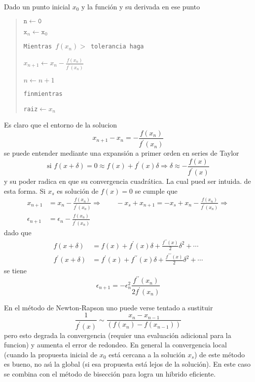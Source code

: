 \documentclass[spanish,titlepage,11pt]{article}
\begin{document}
Dado un punto inicial $x_{0}$ y la funci\'{o}n y su derivada en ese punto

\begin{quotation}
$\mathtt{n\leftarrow0}$

$\mathtt{x}_{n}\mathtt{\leftarrow x}_{0}$

\texttt{Mientras }$f(x_{n})>$\texttt{\ tolerancia haga}

\qquad$x_{n+1}\leftarrow x_{n}-\frac{f(x_{n})}{f^{\prime}(x_{n})}$

\qquad$n\leftarrow n+1$

\texttt{finmientras}

\texttt{raiz}$\leftarrow x_{n}$
\end{quotation}

Es claro que el entorno de la solucion
\[
x_{n+1}-x_{n}=-\frac{f(x_{n})}{f^{\prime}(x_{n})}
\]
se puede entender mediante una expansi\'{o}n a primer orden en series de
Taylor
\[
\text{si }f(x+\delta)=0\approx f(x)+f^{\prime}(x)\delta\Rightarrow
\delta\approx-\frac{f(x)}{f^{\prime}(x)}
\]
y su poder radica en que su convergencia cuadr\'{a}tica. La cual pued ser
intuida. de esta forma. Si $x_{s}$ es soluci\'{o}n de $f(x)=0$ se cumple que
\begin{align}
x_{n+1}  &  =x_{n}-\frac{f(x_{n})}{f^{\prime}(x_{n})}\Rightarrow\qquad
-x_{s}+x_{n+1}=-x_{s}+x_{n}-\frac{f(x_{n})}{f^{\prime}(x_{n})}\Rightarrow\\
\epsilon_{n+1}  &  =\epsilon_{n}-\frac{f(x_{n})}{f^{\prime}(x_{n})}%
\end{align}
dado que
\begin{align}
f(x+\delta)  &  =f(x)+f^{\prime}(x)\delta+\frac{f^{\prime\prime}(x)}{2}%
\delta^{2}+\cdots\\
f^{\prime}(x+\delta)  &  =f^{\prime}(x)+f^{\prime\prime}(x)\delta
+\frac{f^{\prime\prime\prime}(x)}{2}\delta^{2}+\cdots
\end{align}
se tiene
\begin{equation}
\epsilon_{n+1}=-\epsilon_{n}^{2}\frac{f^{\prime\prime}(x_{n})}{2f^{\prime
}(x_{n})}%
\end{equation}

En el m\'{e}todo de Newton-Rapson uno puede verse tentado a sustituir
\begin{equation}
\frac{1}{f^{\prime}(x)}\sim\frac{x_{n}-x_{n-1}}{\left(  f(x_{n})-f(x_{n-1}%
)\right)  }%
\end{equation}
pero esto degrada la convergencia (requier una evaluaci\'{o}n adicional para
la funcion) y aumenta el error de redondeo. En general la convergencia local
(cuando la propuesta inicial de $x_{0}$ est\'{a} cercana a la soluci\'{o}n
$x_{s}$) de este m\'{e}todo es bueno, no as\'{\i} la global (si esa propuesta
est\'{a} lejos de la soluci\'{o}n). En este caso se combina con el m\'{e}todo
de bisecci\'{o}n para logra un hibrido eficiente.
\end{document}
